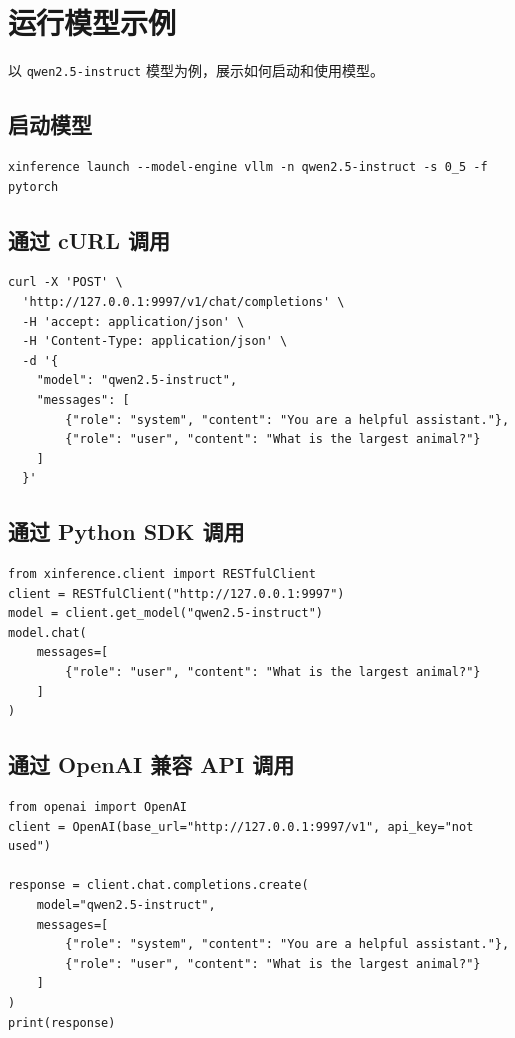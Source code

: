 \documentclass[12pt,UTF8]{ctexbook}
\begin{document}
\section{运行模型示例}
\label{sec:run_model_example}

以 \texttt{qwen2.5-instruct} 模型为例，展示如何启动和使用模型。

\subsection{启动模型}

\begin{lstlisting}
xinference launch --model-engine vllm -n qwen2.5-instruct -s 0_5 -f pytorch
\end{lstlisting}

\subsection{通过 cURL 调用}

\begin{lstlisting}
curl -X 'POST' \
  'http://127.0.0.1:9997/v1/chat/completions' \
  -H 'accept: application/json' \
  -H 'Content-Type: application/json' \
  -d '{
    "model": "qwen2.5-instruct",
    "messages": [
        {"role": "system", "content": "You are a helpful assistant."},
        {"role": "user", "content": "What is the largest animal?"}
    ]
  }'
\end{lstlisting}

\subsection{通过 Python SDK 调用}

\begin{lstlisting}
from xinference.client import RESTfulClient
client = RESTfulClient("http://127.0.0.1:9997")
model = client.get_model("qwen2.5-instruct")
model.chat(
    messages=[
        {"role": "user", "content": "What is the largest animal?"}
    ]
)
\end{lstlisting}

\subsection{通过 OpenAI 兼容 API 调用}

\begin{lstlisting}
from openai import OpenAI
client = OpenAI(base_url="http://127.0.0.1:9997/v1", api_key="not used")

response = client.chat.completions.create(
    model="qwen2.5-instruct",
    messages=[
        {"role": "system", "content": "You are a helpful assistant."},
        {"role": "user", "content": "What is the largest animal?"}
    ]
)
print(response)
\end{lstlisting}
\end{document}
